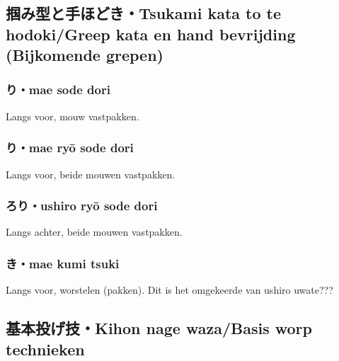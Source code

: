 \subsection{掴み型と手ほどき・Tsukami kata to te hodoki/Greep kata en hand bevrijding (Bijkomende grepen)}
\subsubsection{り・mae sode dori}
Langs voor, mouw vastpakken.

\subsubsection{り・mae ry\={o} sode dori}
Langs voor, beide mouwen vastpakken.

\subsubsection{ろり・ushiro ry\={o} sode dori}
Langs achter, beide mouwen vastpakken.

\subsubsection{き・mae kumi tsuki}
Langs voor, worstelen (pakken). Dit is het omgekeerde van ushiro uwate???

\subsection{基本投げ技・Kihon nage waza/Basis worp technieken}
